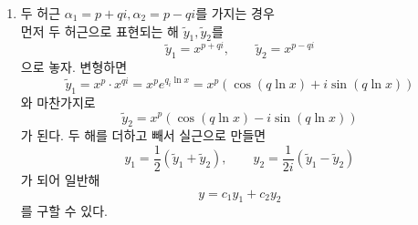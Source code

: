 \documentclass[../engineering_mathematics_lecture_note.tex]{subfiles}
\begin{document}
\begin{example}
\begin{enumerate}
        \item 두 허근 $\alpha_1 = p + qi, \alpha_2 = p - qi$를 가지는 경우\\
            먼저 두 허근으로 표현되는 해 $\tilde y_1, \tilde y_2$를
            \begin{equation*}
                \tilde y_1 = x^{p + qi}, \qquad \tilde y_2 = x^{p - qi}
            \end{equation*}
            으로 놓자.
            변형하면
            \begin{equation*}
                \tilde y_1 = x^p \cdot x^{qi} = x^p e^{q_i \ln x} = x^p \left( \cos (q \ln x) + i\sin(q \ln x) \right)
            \end{equation*}
            와 마찬가지로
            \begin{equation*}
                \tilde y_2 = x^p \left( \cos (q \ln x) - i \sin(q \ln x) \right)
            \end{equation*}
            가 된다.
            두 해를 더하고 빼서 실근으로 만들면
            \begin{equation*}
                y_1 = \frac12 (\tilde y_1 + \tilde y_2), \qquad y_2 = \frac{1}{2i} (\tilde y_1 - \tilde y_2)
            \end{equation*}
            가 되어 일반해
            \begin{equation*}
                y = c_1 y_1 + c_2 y_2
            \end{equation*}
            를 구할 수 있다.
    \end{enumerate}
\end{example}
\end{document}

